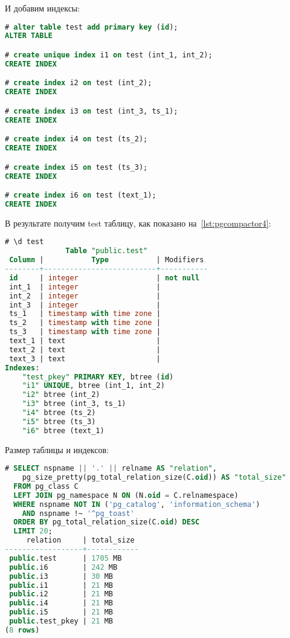 И добавим индексы:

\begin{lstlisting}[language=SQL,label=lst:pgcompactor3,caption=Индексы для test]
# alter table test add primary key (id);
ALTER TABLE

# create unique index i1 on test (int_1, int_2);
CREATE INDEX

# create index i2 on test (int_2);
CREATE INDEX

# create index i3 on test (int_3, ts_1);
CREATE INDEX

# create index i4 on test (ts_2);
CREATE INDEX

# create index i5 on test (ts_3);
CREATE INDEX

# create index i6 on test (text_1);
CREATE INDEX
\end{lstlisting}

В результате получим test таблицу, как показано на~\ref{lst:pgcompactor4}:

\begin{lstlisting}[language=SQL,label=lst:pgcompactor4,caption=Таблица test]
# \d test
              Table "public.test"
 Column |           Type           | Modifiers
--------+--------------------------+-----------
 id     | integer                  | not null
 int_1  | integer                  |
 int_2  | integer                  |
 int_3  | integer                  |
 ts_1   | timestamp with time zone |
 ts_2   | timestamp with time zone |
 ts_3   | timestamp with time zone |
 text_1 | text                     |
 text_2 | text                     |
 text_3 | text                     |
Indexes:
    "test_pkey" PRIMARY KEY, btree (id)
    "i1" UNIQUE, btree (int_1, int_2)
    "i2" btree (int_2)
    "i3" btree (int_3, ts_1)
    "i4" btree (ts_2)
    "i5" btree (ts_3)
    "i6" btree (text_1)

\end{lstlisting}

Размер таблицы и индексов:

\begin{lstlisting}[language=SQL,label=lst:pgcompactor5,caption=Размер таблицы и индексов]
# SELECT nspname || '.' || relname AS "relation",
    pg_size_pretty(pg_total_relation_size(C.oid)) AS "total_size"
  FROM pg_class C
  LEFT JOIN pg_namespace N ON (N.oid = C.relnamespace)
  WHERE nspname NOT IN ('pg_catalog', 'information_schema')
    AND nspname !~ '^pg_toast'
  ORDER BY pg_total_relation_size(C.oid) DESC
  LIMIT 20;
     relation     | total_size
------------------+------------
 public.test      | 1705 MB
 public.i6        | 242 MB
 public.i3        | 30 MB
 public.i1        | 21 MB
 public.i2        | 21 MB
 public.i4        | 21 MB
 public.i5        | 21 MB
 public.test_pkey | 21 MB
(8 rows)
\end{lstlisting}

